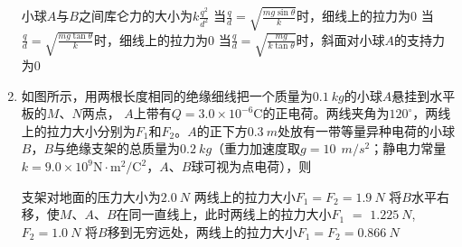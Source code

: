 \begin{enumerate}[leftmargin=0em]
\fourchoices
{小球$ A $与$ B $之间库仑力的大小为$k \frac { q ^ { 2 } } { d ^ { 2 } }$}
{当$\frac { q } { d } = \sqrt { \frac { m g \sin \theta } { k } }$时，细线上的拉力为$ 0 $}
{当$\frac { q } { d } = \sqrt { \frac { m g \tan \theta } { k } }$时，细线上的拉力为$ 0 $}
{当$\frac { q } { d } = \sqrt { \frac { m g } { k \tan \theta } }$时，斜面对小球$ A $的支持力为$ 0 $}






\item
{}
如图所示，用两根长度相同的绝缘细线把一个质量为$ 0.1 \ kg $的小球$ A $悬挂到水平板的$ M $、$ N $两点， $ A $上带有$Q = 3.0 \times 10 ^ { - 6 } \mathrm { C }$的正电荷。两线夹角为$ 120 ^{ \circ } $，两线上的拉力大小分别为$ F_1 $和$ F_2 $。$ A $的正下方$ 0.3\ m $处放有一带等量异种电荷的小球$ B $，$ B $与绝缘支架的总质量为$ 0.2 \ kg $（重力加速度取$ g=10 \ \ m/s ^{2} $；静电力常量$k = 9.0 \times 10 ^ { 9 } \mathrm { N } \cdot \mathrm { m } ^ { 2 } / \mathrm { C } ^ { 2 }$，$ A $、$ B $球可视为点电荷），则  
\begin{figure}[h!]
\centering

\end{figure}

\fourchoices
{支架对地面的压力大小为$ 2.0 \ N $}
{两线上的拉力大小$ F_1=F_2=1.9 \ N $}
{将$ B $水平右移，使$ M $、$ A $、$ B $在同一直线上，此时两线上的拉力大小$ F_1 $ $ = $ $ 1.225 \ N $, $ F_2=1.0 \ N $}
{将$ B $移到无穷远处，两线上的拉力大小$ F_1=F_2=0.866 \ N $}







\end{enumerate}




